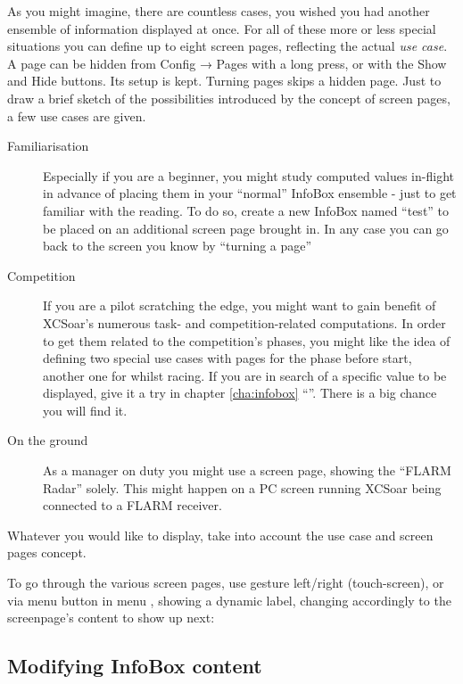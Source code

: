 As you might imagine, there are countless cases, you wished you had another 
ensemble of information displayed at once.  For all of these more or less 
special situations you can define up to eight screen pages, reflecting the 
actual \emph{use case}. A page can be hidden from Config → Pages with a
long press, or with the Show and Hide buttons.  Its setup is kept.
Turning pages skips a hidden page. Just to draw a brief sketch of the possibilities 
introduced by the concept of screen pages, a few use cases are given. 
\label{par:use_case}
\begin{description}
\item[Familiarisation] Especially if you are a beginner, you might study 
computed values in-flight in advance of placing them in your ``normal'' InfoBox
ensemble - just to get familiar with the reading. To do so, create a new 
InfoBox named ``test'' to be placed on an additional screen page brought in. In
any case you can go back to the screen you know by ``turning a page''
\item[Competition] If you are a pilot scratching the edge, you might want to 
gain benefit of XCSoar's numerous task- and competition-related computations. 
In order to get them related to the competition's phases, you might like the 
idea of defining two special use cases with pages for the phase before start, 
another one for whilst racing.  If you are in search of a specific value to
be displayed, give it a try in chapter \ref{cha:infobox} ``''.
There is a big chance you will find it.
\item[On the ground] As a manager on duty you might use a screen page, showing 
the ``FLARM Radar'' solely.  This might happen on a PC screen running XCSoar
being connected to a FLARM receiver.
\end{description}

Whatever you would like to display, take into account the use case and screen 
pages concept.

To go through the various screen pages, use gesture left/right (touch-screen), or via menu button in menu , showing a dynamic label, changing accordingly to the screenpage's content to show up next:

\blink{}\blink{}\blink{}\blink{}


\subsection*{Modifying InfoBox content}

